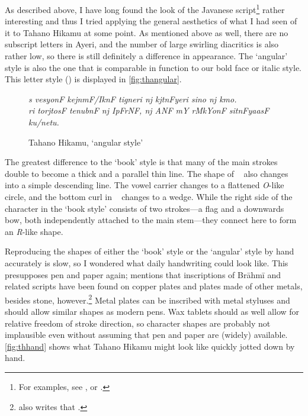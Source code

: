 As described above, I have long found the look of the Javanese
script\footnote{For examples, see \citet{everson2008}, or .}
rather interesting and thus I tried applying the general aesthetics of what I
had seen of it to Tahano Hikamu at some point. As mentioned above as well,
there are no subscript letters in Ayeri, and the number of large swirling
diacritics is also rather low, so there is still definitely a difference in
appearance. The `angular' style is also the one that is comparable in function
to our bold face or italic style. This letter style
() is displayed in \autoref{fig:thangular}.

\begin{figure}[ht]\centering
{\Tagati\itshape\Large s vesyonF kejnmF/IknF tigneri nj kjtnFyeri sino nj
kmo.\\
ri torjtosF tenubnF nj IpFrNF, nj ANF mY rMkYonF sitnFyaasF ku/netu.}
\caption{Tahano Hikamu, `angular style'}
\label{fig:thangular}
\end{figure}

The greatest difference to the `book' style is that many of the main strokes 
double to become a thick and a parallel thin line. The shape of 
~ also changes into a simple descending line. The vowel carrier
 changes to a flattened \textit{O}-like circle, and the bottom curl in
~ changes to a wedge. While the right side of the
~ character in the `book style' consists of two strokes---a
flag and a downwards bow, both independently attached to the main stem---they
connect here to form an \emph{R}-like shape.

Reproducing the shapes of either
the `book' style or the `angular' style by hand accurately is slow, so I
wondered what daily handwriting could look like. This presupposes pen and paper
again; \citet[377]{salomon1996} mentions that inscriptions of Brāhmī and
related scripts have been found on copper plates and plates made of other
metals, besides stone, however.\footnote{\citet{salomon1996} also writes that
.} Metal plates can be inscribed with metal
styluses and should allow similar shapes as modern pens. Wax tablets should as
well allow for relative freedom of stroke direction, so character shapes are
probably not implausible even without assuming that pen and paper are (widely)
available. \autoref{fig:thhand} shows what Tahano Hikamu might look like
quickly jotted down by hand.

